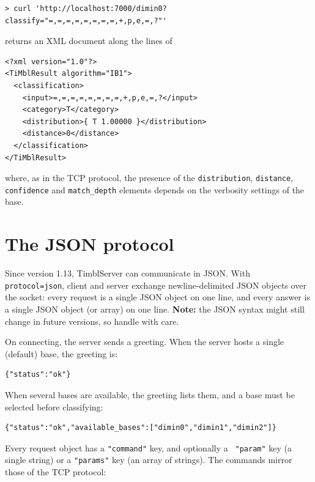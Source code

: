 \documentclass{report}
\begin{document}
\begin{footnotesize}
\begin{verbatim}
> curl 'http://localhost:7000/dimin0?classify="=,=,=,=,=,=,=,=,+,p,e,=,?"'
\end{verbatim}
\end{footnotesize}

returns an XML document along the lines of

\begin{footnotesize}
\begin{verbatim}
<?xml version="1.0"?>
<TiMblResult algorithm="IB1">
  <classification>
    <input>=,=,=,=,=,=,=,=,+,p,e,=,?</input>
    <category>T</category>
    <distribution>{ T 1.00000 }</distribution>
    <distance>0</distance>
  </classification>
</TiMblResult>
\end{verbatim}
\end{footnotesize}

where, as in the TCP protocol, the presence of the {\tt distribution},
{\tt distance}, {\tt confidence} and {\tt match\_depth} elements
depends on the verbosity settings of the base.

\section{The JSON protocol}
\label{jsonproto}

Since version 1.13, TimblServer can communicate in JSON. With {\tt
  protocol=json}, client and server exchange newline-delimited JSON
objects over the socket: every request is a single JSON object on one
line, and every answer is a single JSON object (or array) on one
line. {\bf Note:} the JSON syntax might still change in future
versions, so handle with care.

On connecting, the server sends a greeting. When the server hosts a
single (default) base, the greeting is:

\begin{verbatim}
{"status":"ok"}
\end{verbatim}

When several bases are available, the greeting lists them, and a base
must be selected before classifying:

\begin{verbatim}
{"status":"ok","available_bases":["dimin0","dimin1","dimin2"]}
\end{verbatim}

Every request object has a {\tt "command"} key, and optionally a {\tt
  "param"} key (a single string) or a {\tt "params"} key (an array of
strings). The commands mirror those of the TCP protocol:
\end{document}
